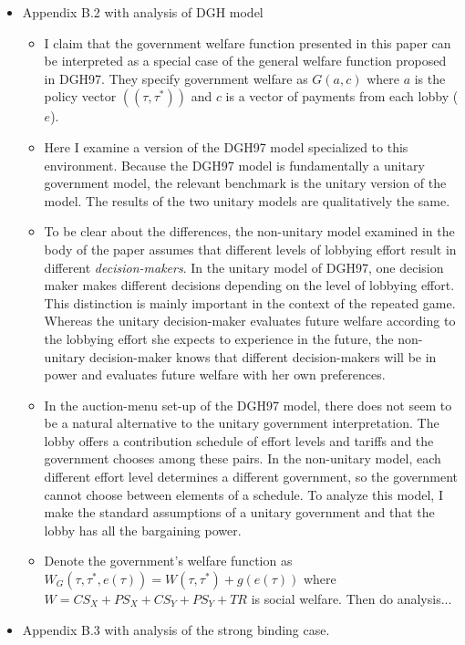 \documentclass[12pt]{article}
\begin{document}
\begin{itemize}
\begin{itemize}
\begin{itemize}
					\end{itemize}
				\item Appendix B.2 with analysis of DGH model
					\begin{itemize}
						\item I claim that the government welfare function presented in this paper can be interpreted as a special case of the general welfare function proposed in DGH97. They specify government welfare as $G(a,c)$ where $a$ is the policy vector $\left(\left(\tau,\tau^*\right)\right)$ and $c$ is a vector of payments from each lobby ($e$).
						\item Here I examine a version of the DGH97 model specialized to this environment. Because the DGH97 model is fundamentally a unitary government model, the relevant benchmark is the unitary version of the model. The results of the two unitary models are qualitatively the same.
						\item To be clear about the differences, the non-unitary model examined in the body of the paper assumes that different levels of lobbying effort result in different \textit{decision-makers}. In the unitary model of DGH97, one decision maker makes different decisions depending on the level of lobbying effort. This distinction is mainly important in the context of the repeated game. Whereas the unitary decision-maker evaluates future welfare according to the lobbying effort she expects to experience in the future, the non-unitary decision-maker knows that different decision-makers will be in power and evaluates future welfare with her own preferences.
						\item In the auction-menu set-up of the DGH97 model, there does not seem to be a natural alternative to the unitary government interpretation. The lobby offers a contribution schedule of effort levels and tariffs and the government chooses among these pairs. In the non-unitary model, each different effort level determines a different government, so the government cannot choose between elements of a schedule. To analyze this model, I make the standard assumptions of a unitary government and that the lobby has all the bargaining power.
						\item Denote the government's welfare function as $W_G(\tau,\tau^*,e(\tau)) = W(\tau,\tau^*) + g(e(\tau))$ where $W = CS_X + PS_X + CS_Y + PS_Y +TR$ is social welfare. Then do analysis...
					\end{itemize}
				\item Appendix B.3 with analysis of the strong binding case. 

\end{itemize}
\end{itemize}
\end{document}

